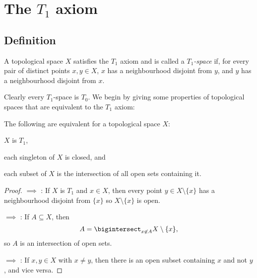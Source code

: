\documentclass[article, a4paper, 11pt, oneside]{memoir}
\numberwithin{equation}{chapter}
\begin{document}
\chapter[The T1 axiom][The $T_1$ axiom]{The $T_1$ axiom}

\section{Definition}

\begin{definition}
    A topological space $X$ satisfies the $T_1$ axiom and is called a \emph{$T_1$-space} if, for every pair of distinct points $x,y \in X$, $x$ has a neighbourhood disjoint from $y$, and $y$ has a neighbourhood disjoint from $x$.
\end{definition}
%
Clearly every $T_1$-space is $T_0$. We begin by giving some properties of topological spaces that are equivalent to the $T_1$ axiom:

\begin{proposition}
    The following are equivalent for a topological space $X$:
    \begin{enumprop}
        \item \label{enum:T1-space} $X$ is $T_1$,
        \item \label{enum:T1-singletons-closed} each singleton of $X$ is closed, and
        \item \label{enum:T1-intersection-of-open-sets} each subset of $X$ is the intersection of all open sets containing it.
    \end{enumprop}
\end{proposition}

\begin{proof}
     $\implies$ : If $X$ is $T_1$ and $x \in X$, then every point $y \in X \setminus \{x\}$ has a neighbourhood disjoint from $\{x\}$ so $X \setminus \{x\}$ is open.

     $\implies$ : If $A \subseteq X$, then
    \begin{equation*}
        A = \bigintersect_{x \not\in A} X \setminus \{x\},
    \end{equation*}
    so $A$ is an intersection of open sets.

     $\implies$ : If $x,y \in X$ with $x \neq y$, then there is an open subset containing $x$ and not $y$, and vice versa.
\end{proof}
\end{document}

